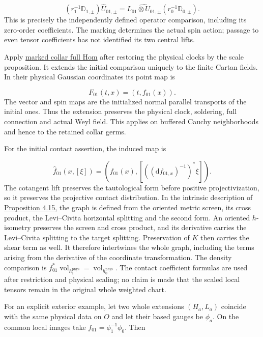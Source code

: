 \documentclass[
  english,
  11pt,
  reqno]{amsart}
\begin{document}
\label{eq:online-fixed-slice-scaled-source-intertwining}
\[
(r_1^{-1}\mathbb D_{1,\pm})\widehat U_{01,\pm}
=\widehat{L_{01}\otimes U_{01,\pm}}
  (r_0^{-1}\mathbb D_{0,\pm}).
\] This is precisely the independently defined operator comparison,
including its zero-order coefficients. The marking determines the actual
spin action; passage to even tensor coefficients has not identified its
two central lifts.

Apply \hyperref[thm:online-marked-collar-full-hom]{marked collar full
Hom} after restoring the physical clocks by the scale proposition. It
extends the initial comparison uniquely to the finite Cartan fields. In
their physical Gaussian coordinates its point map is

\label{eq:online-fixed-slice-physical-clock-comparison}
\[
F_{01}(t,x)=(t,f_{01}(x)).
\] The vector and spin maps are the initialized normal parallel
transports of the initial ones. Thus the extension preserves the
physical clock, soldering, full connection and actual Weyl field. This
applies on buffered Cauchy neighborhoods and hence to the retained
collar germs.

For the initial contact assertion, the induced map is

\label{eq:online-fixed-slice-cotangent-ray-comparison} \[
\widehat f_{01}(x,[\xi])
=\left(f_{01}(x),
  [((\mathrm df_{01,x})^{-1})^*\xi]\right).
\] The cotangent lift preserves the tautological form before positive
projectivization, so it preserves the projective contact distribution.
In the intrinsic description of
\hyperref[prop:online-contact-complete-kinematic-codec]{Proposition
4.15}, the graph is defined from the oriented metric screen, its cross
product, the Levi--Civita horizontal splitting and the second form. An
oriented \(h\)-isometry preserves the screen and cross product, and its
derivative carries the Levi--Civita splitting to the target splitting.
Preservation of \(K\) then carries the shear term as well. It therefore
intertwines the whole graph, including the terms arising from the
derivative of the coordinate transformation. The density comparison is
\(f_{01}^*\operatorname{vol}_{h_1^{\mathrm{phys}}}
=\operatorname{vol}_{h_0^{\mathrm{phys}}}\). The contact coefficient
formulas are used after restriction and physical scaling; no claim is
made that the scaled local tensors remain in the original whole weighted
chart.

For an explicit exterior example, let two whole extensions \((H_a,L_a)\)
coincide with the same physical data on \(O\) and let their based gauges
be \(\phi_a\). On the common local images take
\(f_{01}=\phi_1^{-1}\phi_0\). Then
\end{document}
